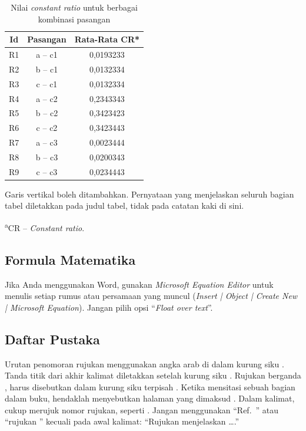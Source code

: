 \documentclass{its-jurnal}
\begin{document}
\begin{table}[t]
  \caption{Nilai \textit{constant ratio} untuk berbagai kombinasi pasangan}
  \label{tab:constant-ratio}
  {\footnotesize
  \begin{tabular*}{\columnwidth}{@{\extracolsep{\fill}}ccc@{}}
    \hline\hline
    Id & Pasangan & Rata-Rata CR* \\
    \hline
    R1 & a -- c1 & 0,0193233 \\
    R2 & b -- c1 & 0,0132334 \\
    R3 & c -- c1 & 0,0132334 \\
    R4 & a -- c2 & 0,2343343 \\
    R5 & b -- c2 & 0,3423423 \\
    R6 & c -- c2 & 0,3423443 \\
    R7 & a -- c3 & 0,0023444 \\
    R8 & b -- c3 & 0,0200343 \\
    R9 & c -- c3 & 0,0234443 \\
    \hline\hline
  \end{tabular*}
  \par\vspace{2pt}
  \noindent Garis vertikal boleh ditambahkan. Pernyataan yang menjelaskan seluruh bagian tabel diletakkan pada judul tabel, tidak pada catatan kaki di sini.
  \par\noindent\textsuperscript{a}CR -- \textit{Constant ratio}.}
\end{table}

\subsection{Formula Matematika}
Jika Anda menggunakan Word, gunakan \textit{Microsoft Equation Editor} untuk menulis setiap rumus atau persamaan yang muncul (\textit{Insert | Object | Create New | Microsoft Equation}). Jangan pilih opsi ``\textit{Float over text}''.

\subsection{Daftar Pustaka}
Urutan penomoran rujukan menggunakan angka arab di dalam kurung siku \cite{young1964}. Tanda titik dari akhir kalimat diletakkan setelah kurung siku \cite{chen1993}. Rujukan berganda \cite{chen1993}, \cite{poor1985} harus disebutkan dalam kurung siku terpisah \cite{young1964,chen1993,poor1985}. Ketika mensitasi sebuah bagian dalam buku, hendaklah menyebutkan halaman yang dimaksud \cite{chen1993}. Dalam kalimat, cukup merujuk nomor rujukan, seperti \cite{poor1985}. Jangan menggunakan ``Ref.~\cite{poor1985}'' atau ``rujukan \cite{poor1985}'' kecuali pada awal kalimat: ``Rujukan \cite{poor1985} menjelaskan \ldots.''
\end{document}
